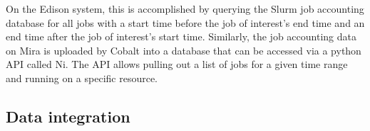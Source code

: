 On the Edison system, this is accomplished by querying the Slurm job accounting database for all jobs with a start time before the job of interest's end time and an end time after the job of interest's start time.
Similarly, the job accounting data on Mira is uploaded by Cobalt into a database that can be accessed via a python API called Ni.
The API allows pulling out a list of jobs for a given time range and running on a specific resource.

%
%

\subsection{Data integration} \label{sec:data-integration}



